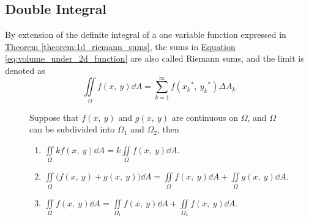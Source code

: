 \documentclass{article}
\begin{document}
\subsection{Double Integral}
\begin{definition}
    By extension of the definite integral of a one variable function expressed in 
    \hyperref[theorem:1d_riemann_sums]{Theorem \ref{theorem:1d_riemann_sums}}, the sums in 
    \hyperref[eq:volume_under_2d_function]{Equation \ref{eq:volume_under_2d_function}} 
    are also called Riemann sums, and the limit is denoted as
    \begin{equation*}
        \iint\limits_{\Omega} f(x,\: y)  \dd{A}
        = \sum_{k=1}^{\infty} f({x_k}^\ast,\: {y_k}^\ast) \Delta A_k
    \end{equation*}
\end{definition}
\begin{figure}[H]
	\begin{mdframed}[style=exampledefault,frametitle={Properties of Double Integrals}]
		\begin{theorem}
            Suppose that $f(x,\: y) $ and $g(x,\: y)$ are continuous on $\Omega$,
            and $\Omega$ can be subdivided into $\Omega_1$ and $\Omega_2$, then
			\begin{enumerate}[label=\normalfont\alph*)]
				\item $\displaystyle\iint\limits_\Omega kf(x,\: y) \dd{A}
                    = k\iint\limits_\Omega f(x,\: y) \dd{A}$.
				\item $\displaystyle\iint\limits_\Omega \bigl(f(x,\: y) + g(x,\: y)\bigr) \dd{A}
                    = \iint\limits_\Omega f(x,\: y) \dd{A} + \iint\limits_\Omega g(x,\: y) \dd{A}$.
                \item $\displaystyle\iint\limits_\Omega f(x,\: y) \dd{A}
                    = \iint\limits_{\Omega_1} f(x,\: y) \dd{A} + \iint\limits_{\Omega_2} f(x,\: y) \dd{A}$.
			\end{enumerate}
		\end{theorem}
	\end{mdframed}
\end{figure}
\end{document}
